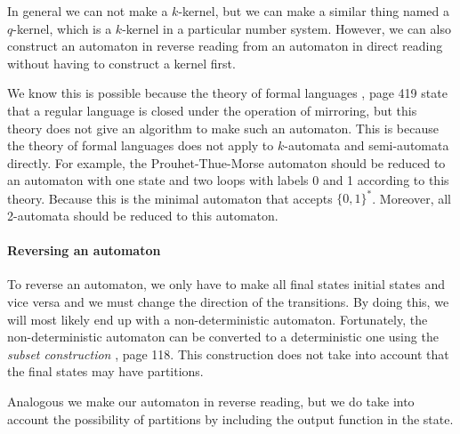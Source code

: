 \documentclass{article}
\theoremstyle{definition}
\begin{document}
In general we can not make a $k$-kernel, but we can make a similar thing named
a $q$-kernel, which is a $k$-kernel in a particular number system. However, we 
can also construct an automaton in reverse reading from an automaton in direct 
reading without having to construct a kernel first.

We know this is possible because the theory of formal languages \cite{Wood}, 
page 419 state that a regular language is closed under the operation of 
mirroring, but this theory does not give an algorithm to make such an 
automaton. This is because the theory of formal languages does not apply to 
$k$-automata and semi-automata directly. For example, the Prouhet-Thue-Morse 
automaton should be reduced to an automaton with one state and two loops with 
labels 0 and 1 according to this theory. Because this is the minimal automaton 
that accepts $\{0, 1\}^*$. Moreover, all 2-automata should be reduced to this 
automaton.

\paragraph{Reversing an automaton}
To reverse an automaton, we only have to make all final states initial states
and vice versa and we must change the direction of the transitions. By doing 
this, we will most likely end up with a non-deterministic automaton. 
Fortunately, the non-deterministic automaton can be converted to a 
deterministic one using the \emph{subset construction} \cite{Wood}, page 118. 
This construction does not take into account that the final states may have 
partitions.

Analogous we make our automaton in reverse reading, but we do take into account
the possibility of partitions by including the output function in the state.
\end{document}
